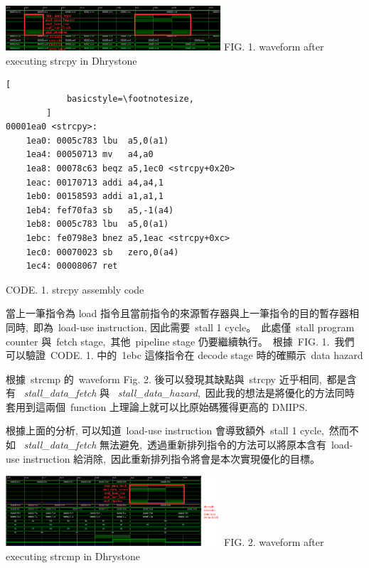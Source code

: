 \documentclass{article}
\begin{document}
\begin{CJK*}{UTF8}{bsmi}
\begin{multicols}{2}
\begin{flushleft}
    \columnbreak

    \begin{flushleft}
        \begin{center}
            \includegraphics[width=8cm]{analyze}
            \small FIG. 1. waveform after executing strcpy in Dhrystone
        \end{center}
    \end{flushleft}
    \begin{center}
        \begin{lstlisting}[
            basicstyle=\footnotesize, 
        ]
00001ea0 <strcpy>:
    1ea0: 0005c783 lbu	a5,0(a1)
    1ea4: 00050713 mv	a4,a0
    1ea8: 00078c63 beqz	a5,1ec0 <strcpy+0x20>
    1eac: 00170713 addi	a4,a4,1
    1eb0: 00158593 addi	a1,a1,1
    1eb4: fef70fa3 sb	a5,-1(a4)
    1eb8: 0005c783 lbu	a5,0(a1)
    1ebc: fe0798e3 bnez	a5,1eac <strcpy+0xc>
    1ec0: 00070023 sb	zero,0(a4)
    1ec4: 00008067 ret
        \end{lstlisting}
        \small CODE. 1. strcpy assembly code
    \end{center}

    當上一筆指令為 load 指令且當前指令的來源暫存器與上一筆指令的目的暫存器相同時,\
    即為\ load-use instruction, 因此需要\ stall 1 cycle。\ 
    此處僅\ stall program counter 與\ fetch stage,\
    其他\ pipeline stage 仍要繼續執行。\
    根據\ FIG. 1.\
    我們可以驗證\ CODE. 1. 中的\ 1ebc 這條指令在 decode stage 時的確顯示\ data hazard\newline

    根據\ strcmp 的\ waveform Fig. 2. 後可以發現其缺點與\ strcpy 近乎相同,\
    都是含有 \ \textit{stall\_data\_fetch} 與 \ \textit{stall\_data\_hazard},\
    因此我的想法是將優化的方法同時套用到這兩個\ function 上理論上就可以比原始碼獲得更高的 DMIPS.\newline

    根據上面的分析, 可以知道\ load-use instruction 會導致額外\ stall 1 cycle,\
    然而不如 \ \textit{stall\_data\_fetch} 無法避免,\
    透過重新排列指令的方法可以將原本含有\ load-use instruction 給消除,\
    因此重新排列指令將會是本次實現優化的目標。

\end{flushleft}

\begin{flushleft}
    \begin{center}
        \includegraphics[width=8cm]{strcmp}
        \small FIG. 2. waveform after executing strcmp in Dhrystone
    \end{center}
\end{flushleft}


\end{multicols}
\end{CJK*}
\end{document}
